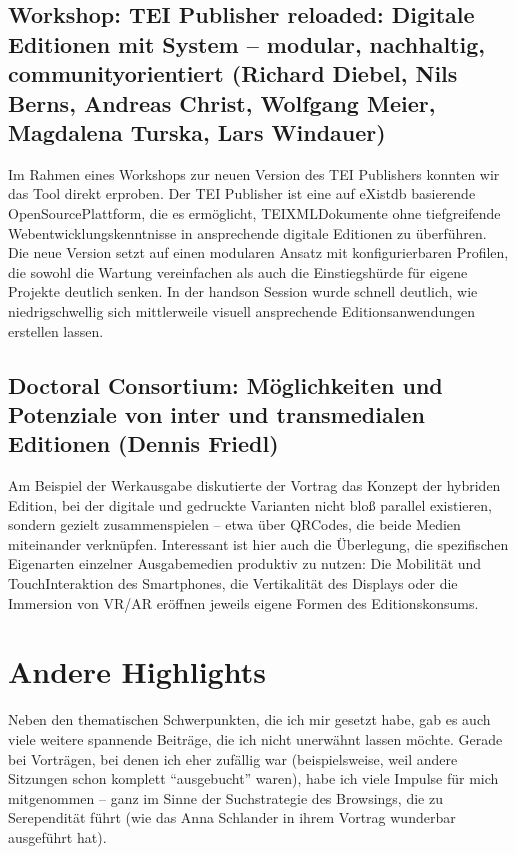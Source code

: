 \documentclass[letterpaper,10pt,english]{jupyterBook}
\begin{document}
\section{Workshop: TEI Publisher reloaded: Digitale Editionen mit System – modular, nachhaltig, community\sphinxhyphen{}orientiert (Richard Diebel, Nils Berns, Andreas Christ, Wolfgang Meier, Magdalena Turska, Lars Windauer)}
\label{\detokenize{tagung/digitale-editionen:workshop-tei-publisher-reloaded-digitale-editionen-mit-system-modular-nachhaltig-community-orientiert-richard-diebel-nils-berns-andreas-christ-wolfgang-meier-magdalena-turska-lars-windauer}}
\sphinxAtStartPar
Im Rahmen eines Workshops zur neuen Version des TEI Publishers konnten wir das Tool direkt erproben. Der TEI Publisher ist eine auf eXist\sphinxhyphen{}db basierende Open\sphinxhyphen{}Source\sphinxhyphen{}Plattform, die es ermöglicht, TEI\sphinxhyphen{}XML\sphinxhyphen{}Dokumente ohne tiefgreifende Webentwicklungskenntnisse in ansprechende digitale Editionen zu überführen. Die neue Version setzt auf einen modularen Ansatz mit konfigurierbaren Profilen, die sowohl die Wartung vereinfachen als auch die Einstiegshürde für eigene Projekte deutlich senken. In der hands\sphinxhyphen{}on Session wurde schnell deutlich, wie niedrigschwellig sich mittlerweile visuell ansprechende Editionsanwendungen erstellen lassen.


\section{Doctoral Consortium: Möglichkeiten und Potenziale von inter\sphinxhyphen{} und transmedialen Editionen (Dennis Friedl)}
\label{\detokenize{tagung/digitale-editionen:doctoral-consortium-moglichkeiten-und-potenziale-von-inter-und-transmedialen-editionen-dennis-friedl}}
\sphinxAtStartPar
Am Beispiel der \sphinxhyphen{}Werkausgabe diskutierte der Vortrag das Konzept der hybriden Edition, bei der digitale und gedruckte Varianten nicht bloß parallel existieren, sondern gezielt zusammenspielen – etwa über QR\sphinxhyphen{}Codes, die beide Medien miteinander verknüpfen. Interessant ist hier auch die Überlegung, die spezifischen Eigenarten einzelner Ausgabemedien produktiv zu nutzen: Die Mobilität und Touch\sphinxhyphen{}Interaktion des Smartphones, die Vertikalität des Displays oder die Immersion von VR/AR eröffnen jeweils eigene Formen des Editionskonsums.

\sphinxstepscope


\chapter{Andere Highlights}
\label{\detokenize{tagung/anderes:andere-highlights}}\label{\detokenize{tagung/anderes::doc}}
\sphinxAtStartPar
Neben den thematischen Schwerpunkten, die ich mir gesetzt habe, gab es auch viele weitere spannende Beiträge, die ich nicht unerwähnt lassen möchte. Gerade bei Vorträgen, bei denen ich eher zufällig war (beispielsweise, weil andere Sitzungen schon komplett “ausgebucht” waren), habe ich viele Impulse für mich mitgenommen – ganz im Sinne der Suchstrategie des Browsings, die zu Serependität führt (wie das Anna Schlander in ihrem Vortrag wunderbar ausgeführt hat).
\end{document}
